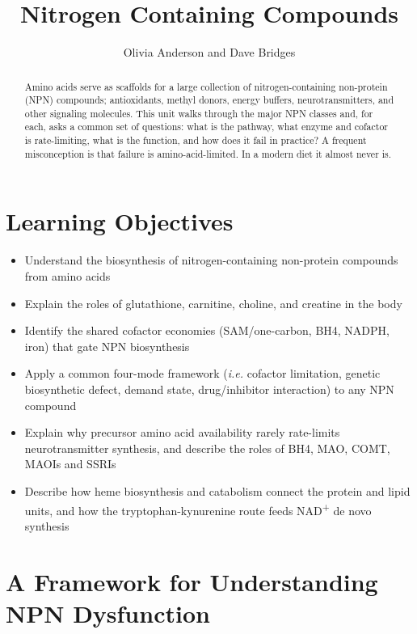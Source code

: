 \documentclass{tufte-handout}
\title{Nitrogen Containing Compounds}
\author{Olivia Anderson and Dave Bridges}
\begin{document}
\maketitle%

\begin{abstract}
\noindent
Amino acids serve as scaffolds for a large collection of nitrogen-containing non-protein (NPN) compounds; antioxidants, methyl donors, energy buffers, neurotransmitters, and other signaling molecules. This unit walks through the major NPN classes and, for each, asks a common set of questions: what is the pathway, what enzyme and cofactor is rate-limiting, what is the function, and how does it fail in practice? A frequent misconception is that failure is amino-acid-limited. In a modern diet it almost never is.
\end{abstract}

\tableofcontents
\pagebreak{}

\section{Learning Objectives}
\begin{itemize}
\item Understand the biosynthesis of nitrogen-containing non-protein compounds from amino acids
\item Explain the roles of glutathione, carnitine, choline, and creatine in the body
\item Identify the shared cofactor economies (SAM/one-carbon, BH4, NADPH, iron) that gate NPN biosynthesis
\item Apply a common four-mode framework (\textit {i.e.} cofactor limitation, genetic biosynthetic defect, demand state, drug/inhibitor interaction) to any NPN compound
\item Explain why precursor amino acid availability rarely rate-limits neurotransmitter synthesis, and describe the roles of BH4, MAO, COMT, MAOIs and SSRIs
\item Describe how heme biosynthesis and catabolism connect the protein and lipid units, and how the tryptophan-kynurenine route feeds NAD\textsuperscript{+} de novo synthesis
\end{itemize}

\section{A Framework for Understanding NPN Dysfunction}\label{sec:npn-framework}
\end{document}
